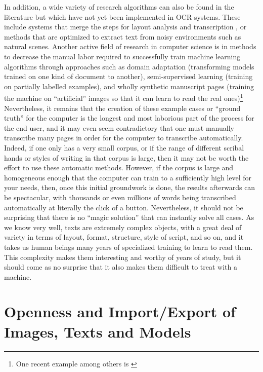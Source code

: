 In addition, a wide variety of research algorithms can also be found in the
literature but which have not yet been implemented in OCR systems. These
include systems that merge the steps for layout analysis and transcription
\cite{wigington2018start}, or methods that are optimized to extract text from
noisy environments such as natural scenes\cite{wang2011end}.
 Another active field of research in computer science is in
methods to decrease the manual labor required to successfully train machine
learning algorithms through approaches such as domain adaptation (transforming
models trained on one kind of document to another), semi-supervised learning
(training on partially labelled examples), and wholly synthetic manuscript
pages (training the machine on “artificial” images so that it can learn to read
the real ones)\footnote{One recent example among others is
\cite{kang2020ganwriting}} Nevertheless, it remains that the creation of these
example cases or “ground truth” for the computer is the longest and most
laborious part of the process for the end user, and it may even seem
contradictory that one
must manually transcribe many pages in order for the computer to transcribe
automatically. Indeed, if one only has a very small corpus, or if the range of
different scribal hands or styles of writing in that corpus is large, then it
may not be worth the effort to use these automatic methods. However, if the
corpus is large and homogeneous enough that the computer can train to a
sufficiently high level for your needs, then, once this initial groundwork is
done, the results afterwards can be spectacular, with thousands or even
millions of words being transcribed automatically at literally the click of a
button. Nevertheless, it should not be surprising that there is no “magic
solution” that can instantly solve all cases. As we know very well, texts are
extremely complex objects, with a great deal of variety in terms of layout,
format, structure, style of script, and so on, and it takes us human beings
many years of specialized training to learn to read them. This complexity makes
them interesting and worthy of years of study, but it should come as no
surprise that it also makes them difficult to treat with a machine. 

\section{Openness and Import/Export of Images, Texts and Models}

